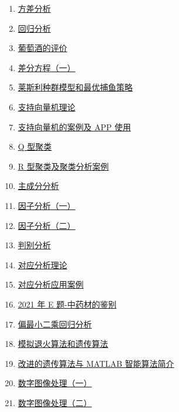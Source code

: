 \documentclass[11pt]{article}
\begin{document}
\begin{multicols}{2}
\begin{enumerate}
		\item \href{https://mp.weixin.qq.com/s/MAWWVkacB9wFX1rZpEKQvg}{方差分析}	%
		\item \href{https://mp.weixin.qq.com/s/l6EuoZvWz-GMjhfekQqKww}{回归分析}	%
		\item \href{https://mp.weixin.qq.com/s/Mlm2fVnpqnAxvkl2AVMbXQ}{葡萄酒的评价}	%
		\item \href{https://mp.weixin.qq.com/s/XRjfwEOyapleLhIE9BOt7g}{差分方程（一）}	%
		\item \href{https://mp.weixin.qq.com/s/2Zn33ZZttZMP0sy3wScX3w}{莱斯利种群模型和最优捕鱼策略}	%
		\item \href{https://mp.weixin.qq.com/s/FS54kriZHFYK7D3J964zvQ}{支持向量机理论}	%
		\item \href{https://mp.weixin.qq.com/s/YMFoA8_bxGEQeB7hpW7ITw}{支持向量机的案例及 APP 使用}	%
		\item \href{https://mp.weixin.qq.com/s/G9vLskepGJpxDm7tmrOzZg}{Q 型聚类}	%
		\item \href{https://mp.weixin.qq.com/s/G5ie4Jtx-8qITBu2AzdxAQ}{R 型聚类及聚类分析案例}	%
		\item \href{https://mp.weixin.qq.com/s/uV07NA_aknbZlAIYXP41fg}{主成分分析}	%
		\item \href{https://mp.weixin.qq.com/s/JivFL-op7SKVTjyts6bGnw}{因子分析（一）}	%
		\item \href{https://mp.weixin.qq.com/s/_5CeBL4vjGgLM2uMKbx2wQ}{因子分析（二）}	%
		\item \href{https://mp.weixin.qq.com/s/_bq-YQxVKJPKmElvAO-qPQ}{判别分析}	%
		\item \href{https://mp.weixin.qq.com/s/J4vuhSe504IsXzXuFbwakQ}{对应分析理论}	%
		\item \href{https://mp.weixin.qq.com/s/SbdPMtHttbRGaRhQoXAjhw}{对应分析应用案例}	%
		\item \href{https://mp.weixin.qq.com/s/D6GgMvYVK6TvZIjd6mE7VA}{2021 年 E 题-中药材的鉴别}	%
		\item \href{https://mp.weixin.qq.com/s/jTy4TI9dZHiPJKYW3o5l3w}{偏最小二乘回归分析}	%
		\item \href{https://mp.weixin.qq.com/s/3Q41q4L3wxvqfD2qRY-cEA}{模拟退火算法和遗传算法}	%
		\item \href{https://mp.weixin.qq.com/s/85LcButzNMyJdtIrgPr7xw}{改进的遗传算法与 MATLAB 智能算法简介}	%
		\item \href{https://mp.weixin.qq.com/s/4AfgKF1WYtvvyju00V5-1A}{数字图像处理（一）}	%
		\item \href{https://mp.weixin.qq.com/s/yi0gVa0IKxlg33YAbScWwA}{数字图像处理（二）}	%

\end{enumerate}
\end{multicols}
\end{document}
